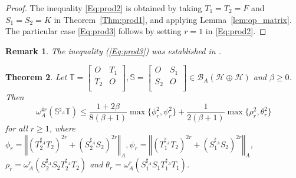 \documentclass{article}
\newcommand{\bra}[1]{\left(#1\right)}
\newcommand{\normA}[1]{{\left\Vert#1\right\Vert}_{A}}
\newcommand{\hh}{\mathcal{H}\oplus\mathcal{H}}
\newcommand {\T}{\mathbb{T}}
\renewcommand {\S}{\mathbb{S}}
\newcommand {\Sa}{\mathbb{S}^{\sharp_{A}}}
\renewcommand {\b}{\mathcal{B}}
\newcommand {\Toa}{T_{1}^{\sharp_{A}}}
\newcommand {\Soa}{S_{1}^{\sharp_{A}}}
\newcommand {\Tta}{T_{2}^{\sharp_{A}}}
\newcommand {\Sta}{S_{2}^{\sharp_{A}}}
\newtheorem{theorem}{Theorem}[section]
\newtheorem{remark}[theorem]{Remark}
\begin{document}
 \begin{proof} The inequality \eqref{Eq:prod2} is obtained by taking $T_1 = T_2 = F$ and $S_1 = S_2 = K$ in Theorem~\ref{Thm:prod1}, and applying Lemma~\ref{lem:op_matrix}. The particular case \eqref{Eq:prod3} follows by setting $r = 1$ in \eqref{Eq:prod2}.
 \end{proof}
 \begin{remark} The inequality (\ref{Eq:prod3}) was established in \cite[Theorem 3.3]{QHC}.
 \end{remark}
 \begin{theorem}\label{Thm:prod2} Let $\T=\begin{bmatrix} O& T_1\\ T_2& O \\\end{bmatrix}, \S=\begin{bmatrix} O& S_1\\ S_2& O \\\end{bmatrix}\in\b_A(\hh)$ and $\beta\geq 0$. Then
 \begin{equation}\label{Eq:prod2}
 \omega_A^{4r}\bra{\Sa \T}\leq \frac{1+2\beta}{8(\beta+1)}\max\{\phi_r^2,\psi_r^2\}+\frac{1}{2(\beta+1)}
 \max\{\rho_r^2,\theta_r^2\}
 \end{equation}
 for all $r\geq 1$, where $\phi_r=\normA{\bra{\Tta T_2}^{2r}+\bra{\Sta S_2}^{2r}},\psi_r=\normA{\bra{\Toa T_2}^{2r}+\bra{\Soa S_2}^{2r}}$,
 $\rho_r=\omega_A^{r}\bra{\Sta S_2\Tta T_2}$ and $\theta_r=\omega_A^{r}\bra{\Soa S_1\Toa T_1}$.
 \end{theorem}
\end{document}
